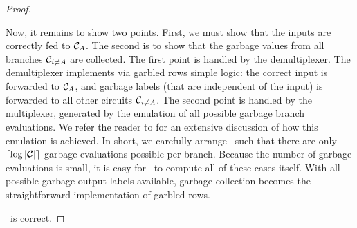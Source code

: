 \begin{proof}
\begin{itemize}
      Now, it remains to show two points.
      First, we must show that the inputs are correctly fed to
      $\mathcal C_A$. The second is to show that the garbage values from all
      branches $\mathcal C_{i \neq A}$ are collected.
      The first point is handled by the demultiplexer.
      The demultiplexer implements via garbled rows simple logic: the
      correct input is forwarded to $\mathcal C_A$, and garbage labels (that
      are independent of the input) is forwarded to all other circuits
      $\mathcal C_{i \neq A}$.
      The second point is handled by the multiplexer, generated by the
      emulation of all possible garbage branch evaluations.
      We refer the reader to  for an extensive
      discussion of how this emulation is achieved.
      In short, we carefully arrange \gadget\ such that there are
      only $\lceil \log |\vec \cir| \rceil$ garbage evaluations
      possible per branch.
      Because the number of garbage evaluations is small, it is easy
      for \gGb\ to compute all of these cases itself.
      With all possible garbage output labels available, garbage
      collection becomes the straightforward implementation of garbled
      rows.
  \end{itemize}
  \ourschemelong\ is correct.
\end{proof}

